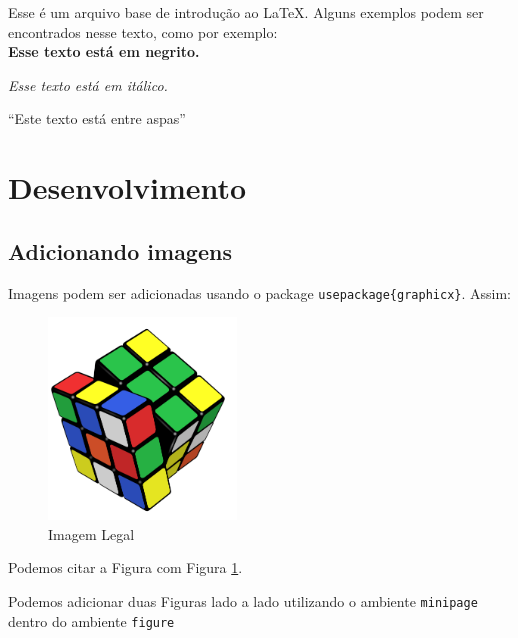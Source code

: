 \documentclass[11pt]{article}
\begin{document}
Esse é um arquivo base de introdução ao LaTeX. Alguns exemplos podem ser encontrados nesse texto, como por exemplo:
\\

\textbf{Esse texto está em negrito.}

\textit{Esse texto está em itálico.}

``Este texto está entre aspas''


\section{Desenvolvimento}

\subsection{Adicionando imagens}

Imagens podem ser adicionadas usando o package \texttt{usepackage\{graphicx\}}. Assim:

\begin{figure}[!ht] %
\centering
	\includegraphics[width=5cm]{rubiks.png}
	\caption{Imagem Legal}
	\label{fig:cube}
\end{figure}

Podemos citar a Figura com Figura \ref{fig:cube}.

Podemos adicionar duas Figuras lado a lado utilizando o ambiente \texttt{minipage} dentro do ambiente \texttt{figure}
\end{document}
